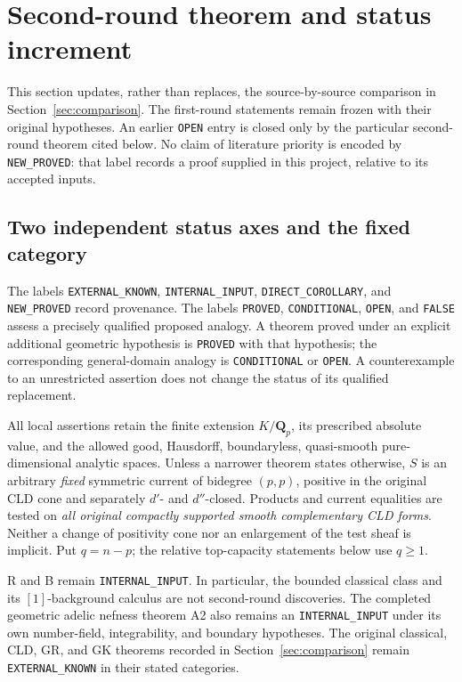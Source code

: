 \section{Second-round theorem and status increment}
\label{sec:r2-status}

This section updates, rather than replaces, the source-by-source comparison
in Section~\ref{sec:comparison}. The first-round statements remain frozen
with their original hypotheses. An earlier \texttt{OPEN} entry is closed
only by the particular second-round theorem cited below. No claim of
literature priority is encoded by \texttt{NEW\_PROVED}: that label records
a proof supplied in this project, relative to its accepted inputs.

\subsection{Two independent status axes and the fixed category}

The labels \texttt{EXTERNAL\_KNOWN}, \texttt{INTERNAL\_INPUT},
\texttt{DIRECT\_COROLLARY}, and \texttt{NEW\_PROVED} record provenance.
The labels \texttt{PROVED}, \texttt{CONDITIONAL}, \texttt{OPEN}, and
\texttt{FALSE} assess a precisely qualified proposed analogy. A theorem
proved under an explicit additional geometric hypothesis is
\texttt{PROVED} with that hypothesis; the corresponding general-domain
analogy is \texttt{CONDITIONAL} or \texttt{OPEN}. A counterexample to an
unrestricted assertion does not change the status of its qualified
replacement.

All local assertions retain the finite extension $K/\mathbf Q_p$, its
prescribed absolute value, and the allowed good, Hausdorff, boundaryless,
quasi-smooth pure-dimensional analytic spaces. Unless a narrower theorem
states otherwise, $S$ is an arbitrary \emph{fixed} symmetric current of
bidegree $(p,p)$, positive in the original CLD cone and separately
$d'$- and $d''$-closed. Products and current equalities are tested on
\emph{all original compactly supported smooth complementary CLD forms}.
Neither a change of positivity cone nor an enlargement of the test sheaf
is implicit. Put $q=n-p$; the relative top-capacity statements below use
$q\geq1$.

R and B remain \texttt{INTERNAL\_INPUT}. In particular, the bounded
classical class and its $[1]$-background calculus are not second-round
discoveries. The completed geometric adelic nefness theorem A2 also
remains an \texttt{INTERNAL\_INPUT} under its own number-field,
integrability, and boundary hypotheses. The original classical, CLD,
GR, and GK theorems recorded in Section~\ref{sec:comparison} remain
\texttt{EXTERNAL\_KNOWN} in their stated categories.

